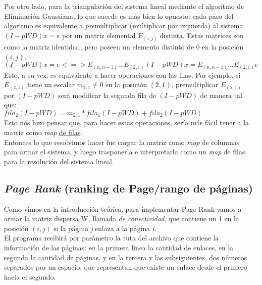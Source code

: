 		Por otro lado, para la triangulación del sistema lineal mediante el algoritmo de Eliminación Gaussiana, lo que sucede es más bien lo opuesto: cada paso del algoritmo es equivalente a \textit{pre}multiplicar (multiplicar por izquierda) al sistema $(I - pWD) x = e$ por un matriz elemental $E_{(i,j)}$ distinta. Estas matrices son como la matriz identidad, pero poseen un elemento distinto de $0$ en la posición $(i,j)$. \\

		$ (I - pWD) x = e <=> E_{(n,n-1)} \hdots E_{(2,1)} (I - pWD) x = E_{(n,n-1)} \hdots E_{(2,1)} e $ \\

		Esto, a su vez, es equivalente a hacer operaciones con las filas. Por ejemplo, si $E_{(2,1)}$ tiene un escalar $m_{2,1} \neq 0$ en la posición $(2,1)$, premultiplicar $E_{(2,1)}$ por $(I - pWD)$ será modificar la segunda fila de $(I - pWD)$ de manera tal que: \\

		$fila_{2}(I-pWD) = m_{2,1} *  fila_{1}(I-pWD) + fila_{2}(I-pWD)$ \\

		Esto nos hizo pensar que, para hacer estas operaciones, sería más fácil tener a la matriz como \textit{map} \underline{de filas}. \\

		Entonces lo que resolvimos hacer fue cargar la matriz como \textit{map} de columnas para armar el sistema, y luego trasponerla e interpretarla como un \textit{map} de filas para la resolución del sistema lineal. \\

	\subsection{\textit{Page Rank} (ranking de Page/rango de páginas)}

		Como vimos en la introducción teórica, para implementar Page Rank vamos a armar la matriz dispersa W, llamada \textit{de conectividad}, que contiene un 1 en la posición $(i,j)$ si la página \textit{j} enlaza a la página \textit{i}. \\

		El programa recibirá por parámetro la ruta del archivo que contiene la información de las páginas: en la primera línea la cantidad de enlaces, en la segunda la cantidad de páginas, y en la tercera y las subsiguientes, dos números separados por un espacio, que representan que existe un enlace desde el primero hacia el segundo. \\

